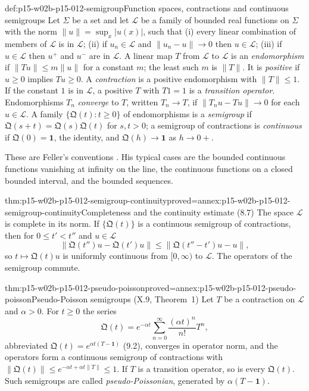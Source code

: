 \begin{hbdefinition}{def:p15-w02b-p15-012-semigroup}{Function spaces, contractions and continuous semigroups}
Let \(\Sigma\) be a set and let \(\mathscr L\) be a family of bounded real
functions on \(\Sigma\) with the norm \(\|u\|=\sup_x|u(x)|\), such that
(i) every linear combination of members of \(\mathscr L\) is in
\(\mathscr L\); (ii) if \(u_n\in\mathscr L\) and \(\|u_n-u\|\to0\) then
\(u\in\mathscr L\); (iii) if \(u\in\mathscr L\) then \(u^+\) and \(u^-\)
are in \(\mathscr L\). A linear map \(T\) from \(\mathscr L\) to
\(\mathscr L\) is an \emph{endomorphism} if \(\|Tu\|\leq m\|u\|\) for a
constant \(m\); the least such \(m\) is \(\|T\|\). It is \emph{positive} if
\(u\geq0\) implies \(Tu\geq0\). A \emph{contraction} is a positive
endomorphism with \(\|T\|\leq1\). If the constant \(1\) is in \(\mathscr L\),
a positive \(T\) with \(T1=1\) is a \emph{transition operator}.
Endomorphisms \(T_n\) \emph{converge} to \(T\), written \(T_n\to T\), if
\(\|T_nu-Tu\|\to0\) for each \(u\in\mathscr L\). A family
\(\{\mathfrak Q(t):t\geq0\}\) of endomorphisms is a \emph{semigroup} if
\(\mathfrak Q(s+t)=\mathfrak Q(s)\mathfrak Q(t)\) for \(s,t>0\); a semigroup
of contractions is \emph{continuous} if \(\mathfrak Q(0)=\mathbf 1\), the
identity, and \(\mathfrak Q(h)\to\mathbf 1\) as \(h\to0+\).
\end{hbdefinition}

These are Feller's conventions \cite[vol.~II, X.8, pp.~350--352]{Feller1971ProbabilityII}.
His typical cases are the bounded continuous functions vanishing at infinity
on the line, the continuous functions on a closed bounded interval, and the
bounded sequences.

\begin{hblemma}{thm:p15-w02b-p15-012-semigroup-continuity}{proved=annex:p15-w02b-p15-012-semigroup-continuity}{Completeness and the continuity estimate (8.7)}
The space \(\mathscr L\) is complete in its norm. If \(\{\mathfrak Q(t)\}\) is
a continuous semigroup of contractions, then for \(0\leq t'<t''\) and
\(u\in\mathscr L\)
\[
 \|\mathfrak Q(t'')u-\mathfrak Q(t')u\|\leq\|\mathfrak Q(t''-t')u-u\|,
 \tag{8.7}
\]
so \(t\mapsto\mathfrak Q(t)u\) is uniformly continuous from \([0,\infty)\) to
\(\mathscr L\). The operators of the semigroup commute.
\end{hblemma}

\begin{hbtheorem}{thm:p15-w02b-p15-012-pseudo-poisson}{proved=annex:p15-w02b-p15-012-pseudo-poisson}{Pseudo-Poisson semigroups (X.9, Theorem~1)}
Let \(T\) be a contraction on \(\mathscr L\) and \(\alpha>0\). For
\(t\geq0\) the series
\[
 \mathfrak Q(t)=e^{-\alpha t}\sum_{n=0}^\infty\frac{(\alpha t)^n}{n!}T^n,
 \tag{9.1}
\]
abbreviated \(\mathfrak Q(t)=e^{\alpha t(T-\mathbf 1)}\) (9.2), converges in
operator norm, and the operators form a continuous semigroup of contractions
with \(\|\mathfrak Q(t)\|\leq e^{-\alpha t+\alpha t\|T\|}\leq1\). If \(T\) is a
transition operator, so is every \(\mathfrak Q(t)\). Such semigroups are
called \emph{pseudo-Poissonian}, generated by \(\alpha(T-\mathbf 1)\).
\end{hbtheorem}


